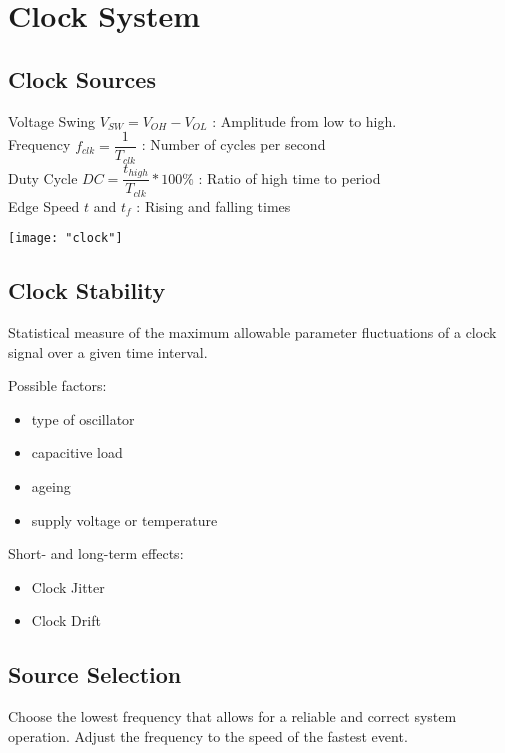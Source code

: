 \section{Clock System}
\subsection{Clock Sources }
Voltage Swing $V_{SW} = V_{OH} - V_{OL}$ : Amplitude from low to high.\\
Frequency $f_{clk} = \dfrac{1}{T_{clk}}$ : Number of cycles per second\\
Duty Cycle $DC = \dfrac{t_{high}}{T_{clk}} * 100 \%$ : Ratio of high time to period\\
Edge Speed $t$ and $t_f$ : Rising and falling times

\texttt{[image: "clock"]}

\subsection{Clock Stability }
Statistical measure of the maximum allowable parameter fluctuations of a clock signal
over a given time interval.

\begin{minipage}[t]{0.5\columnwidth}
	Possible factors:
	\begin{itemize}
		\itemsep-.5em 
		\item type of oscillator
		\item capacitive load
		\item ageing
		\item supply voltage or temperature
	\end{itemize}
\end{minipage}
\begin{minipage}[t]{0.5\columnwidth}
	Short- and long-term effects:
	\begin{itemize}
		\itemsep-.5em 
		\item Clock Jitter
		\item Clock Drift
	\end{itemize}
\end{minipage}
\vspace{2mm}

\subsection{Source Selection }
Choose the lowest frequency that allows for a reliable and correct system operation.
Adjust the frequency to the speed of the fastest event.


